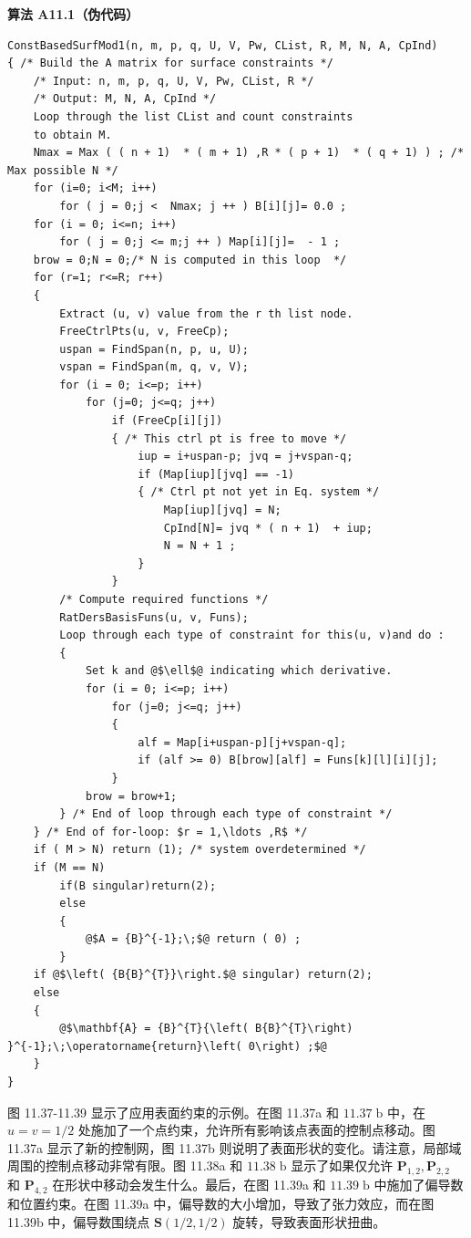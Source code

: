 \documentclass[../main.tex]{subfiles}
\begin{document}
\par\medskip\noindent\textbf{算法 A11.1（伪代码）}\par
\begin{verbatim}
ConstBasedSurfMod1(n, m, p, q, U, V, Pw, CList, R, M, N, A, CpInd)
{ /* Build the A matrix for surface constraints */
    /* Input: n, m, p, q, U, V, Pw, CList, R */
    /* Output: M, N, A, CpInd */
    Loop through the list CList and count constraints
    to obtain M.
    Nmax = Max ( ( n + 1)  * ( m + 1) ,R * ( p + 1)  * ( q + 1) ) ; /* Max possible N */
    for (i=0; i<M; i++)
        for ( j = 0;j <  Nmax; j ++ ) B[i][j]= 0.0 ;
    for (i = 0; i<=n; i++)
        for ( j = 0;j <= m;j ++ ) Map[i][j]=  - 1 ;
    brow = 0;N = 0;/* N is computed in this loop  */
    for (r=1; r<=R; r++)
    {
        Extract (u, v) value from the r th list node.
        FreeCtrlPts(u, v, FreeCp);
        uspan = FindSpan(n, p, u, U);
        vspan = FindSpan(m, q, v, V);
        for (i = 0; i<=p; i++)
            for (j=0; j<=q; j++)
                if (FreeCp[i][j])
                { /* This ctrl pt is free to move */
                    iup = i+uspan-p; jvq = j+vspan-q;
                    if (Map[iup][jvq] == -1)
                    { /* Ctrl pt not yet in Eq. system */
                        Map[iup][jvq] = N;
                        CpInd[N]= jvq * ( n + 1)  + iup;
                        N = N + 1 ;
                    }
                }
        /* Compute required functions */
        RatDersBasisFuns(u, v, Funs);
        Loop through each type of constraint for this(u, v)and do :
        {
            Set k and @$\ell$@ indicating which derivative.
            for (i = 0; i<=p; i++)
                for (j=0; j<=q; j++)
                {
                    alf = Map[i+uspan-p][j+vspan-q];
                    if (alf >= 0) B[brow][alf] = Funs[k][l][i][j];
                }
            brow = brow+1;
        } /* End of loop through each type of constraint */
    } /* End of for-loop: $r = 1,\ldots ,R$ */
    if ( M > N) return (1); /* system overdetermined */
    if (M == N)
        if(B singular)return(2);
        else
        {
            @$A = {B}^{-1};\;$@ return ( 0) ;
        }
    if @$\left( {B{B}^{T}}\right.$@ singular) return(2);
    else
    {
        @$\mathbf{A} = {B}^{T}{\left( B{B}^{T}\right) }^{-1};\;\operatorname{return}\left( 0\right) ;$@
    }
}
\end{verbatim}

图 11.37-11.39 显示了应用表面约束的示例。在图 11.37a 和 \({11.37}\mathrm{\;b}\) 中，在 \(u = v = 1/2\) 处施加了一个点约束，允许所有影响该点表面的控制点移动。图 11.37a 显示了新的控制网，图 11.37b 则说明了表面形状的变化。请注意，局部域周围的控制点移动非常有限。图 11.38a 和 \({11.38}\mathrm{\;b}\) 显示了如果仅允许 \({\mathbf{P}}_{1,2},{\mathbf{P}}_{2,2}\) 和 \({\mathbf{P}}_{4,2}\) 在形状中移动会发生什么。最后，在图 11.39a 和 \({11.39}\mathrm{\;b}\) 中施加了偏导数和位置约束。在图 11.39a 中，偏导数的大小增加，导致了张力效应，而在图 11.39b 中，偏导数围绕点 \(\mathbf{S}\left( {1/2,1/2}\right)\) 旋转，导致表面形状扭曲。
\end{document}
